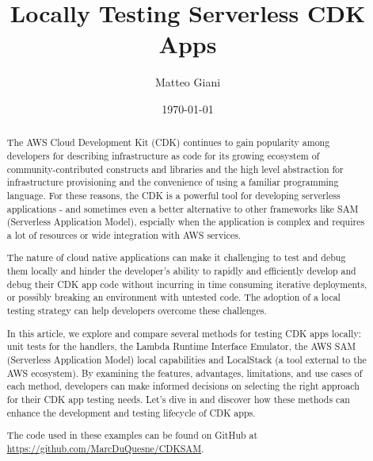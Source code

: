 \documentclass{article}
\title{Locally Testing Serverless CDK Apps}
\author{Matteo Giani}
\date{\today}
\begin{document}
\maketitle

\begin{abstract}

The AWS Cloud Development Kit (CDK) continues to gain popularity among developers for describing infrastructure as code for its growing ecosystem of community-contributed constructs and libraries and the high level abstraction for infrastructure provisioning and the convenience of using a familiar programming language. For these reasons, the CDK is a powerful tool for developing serverless applications - and sometimes even a better alternative to other frameworks like SAM (Serverless Application Model), espcially when the application is complex and requires a lot of resources or wide integration with AWS services.

The nature of cloud native applications can make it challenging to test and debug them locally and hinder the developer's ability to rapidly and efficiently develop and debug their CDK app code without incurring in time consuming iterative deployments, or possibly breaking an environment with untested code. The adoption of a local testing strategy can help developers overcome these challenges.




In this article, we explore and compare several methods for testing CDK apps locally: unit tests for the handlers, the Lambda Runtime Interface Emulator, the AWS SAM (Serverless Application Model) local capabilities and LocalStack (a tool external to the AWS ecosystem). By examining the features, advantages, limitations, and use cases of each method, developers can make informed decisions on selecting the right approach for their CDK app testing needs. Let's dive in and discover how these methods can enhance the development and testing lifecycle of CDK apps.

The code used in these examples can be found on GitHub at \url{https://github.com/MarcDuQuesne/CDKSAM}.

\end{abstract}
\end{document}
